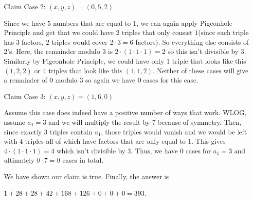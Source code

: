 \begin{enumerate}
 Claim Case 2: $(x, y, z) = (0, 5, 2)$

 Since we have $5$ numbers that are equal to $1$, we can again apply Pigeonhole Principle and get that we could have $2$ triples that only consist $1$(since each triple has $3$ factors, $2$ triples would cover $2 \cdot 3 = 6$ factors). So everything else consists of $2$'s. Here, the remainder modulo $3$ is $2 \cdot (1 \cdot 1 \cdot 1) = 2$ so this isn't divisible by $3$. Similarly by Pigeonhole Principle, we could have only $1$ triple that looks like this $(1, 2, 2)$ or $4$ triples that look like this $(1, 1, 2)$. Neither of these cases will give a remainder of $0$ modulo $3$ so again we have $0$ cases for this case.

 Claim Case 3: $(x, y, z) = (1, 6, 0)$

 Assume this case does indeed have a positive number of ways that work. WLOG, assume $a_1 = 3$ and we will multiply the result by $7$ because of symmetry. Then, since exactly $3$ triples contain $a_1$, those triples would vanish and we would be left with $4$ triples all of which have factors that are only equal to $1$. This gives $4 \cdot (1 \cdot 1 \cdot 1) = 4$ which isn't divisible by $3$. Thus, we have $0$ cases for $a_1 = 3$ and ultimately $0 \cdot 7 = 0$ cases in total.

 We have shown our claim is true. Finally, the answer is

 $1 + 28 + 28 + 42 + 168 + 126 + 0 + 0 + 0 = \boxed{393}$.

 


\end{enumerate}